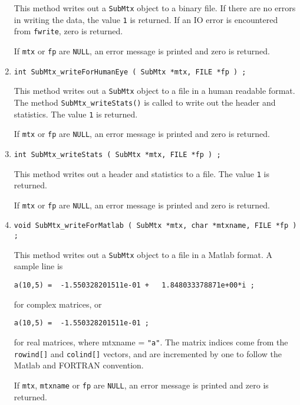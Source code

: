 \begin{enumerate}
\begin{verbatim}
\end{verbatim}
\par
This method writes out a {\tt SubMtx} object to a binary file.
If there are no errors in writing the data, 
the value {\tt 1} is returned.
If an IO error is encountered from {\tt fwrite}, zero is returned.
\par {}
If {\tt mtx} or {\tt fp} are {\tt NULL},
an error message is printed and zero is returned.
\item
\begin{verbatim}
int SubMtx_writeForHumanEye ( SubMtx *mtx, FILE *fp ) ;
\end{verbatim}
\par
This method writes out a {\tt SubMtx} object to a file in a human
readable format.
The method {\tt SubMtx\_writeStats()} 
is called to write out the
header and statistics. 
The value {\tt 1} is returned.
\par {}
If {\tt mtx} or {\tt fp} are {\tt NULL},
an error message is printed and zero is returned.
\item
\begin{verbatim}
int SubMtx_writeStats ( SubMtx *mtx, FILE *fp ) ;
\end{verbatim}
\par
This method writes out a header and statistics to a file.
The value {\tt 1} is returned.
\par {}
If {\tt mtx} or {\tt fp} are {\tt NULL},
an error message is printed and zero is returned.
\item
\begin{verbatim}
void SubMtx_writeForMatlab ( SubMtx *mtx, char *mtxname, FILE *fp ) ;
\end{verbatim}
\par
This method writes out a {\tt SubMtx} object to a file in a Matlab format.
A sample line is
\begin{verbatim}
a(10,5) =  -1.550328201511e-01 +   1.848033378871e+00*i ;
\end{verbatim}
for complex matrices, or
\begin{verbatim}
a(10,5) =  -1.550328201511e-01 ;
\end{verbatim}
for real matrices, where mtxname = {\tt "a"}.
The matrix indices come from the {\tt rowind[]} and {\tt colind[]}
vectors, and are incremented by one to follow the Matlab and
FORTRAN convention.
\par {}
If {\tt mtx}, {\tt mtxname} or {\tt fp} are {\tt NULL},
an error message is printed and zero is returned.
\end{enumerate}
